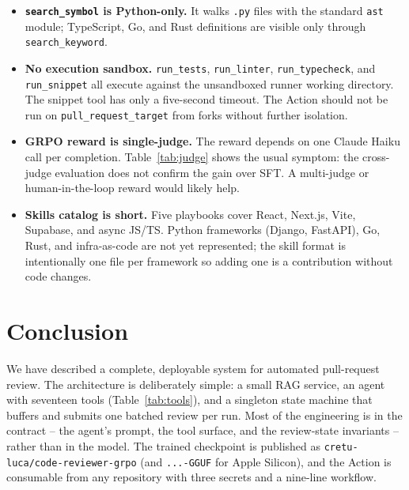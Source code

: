 \documentclass[11pt,a4paper]{article}
\newcommand{\code}[1]{\texttt{\small #1}}
\begin{document}
\begin{itemize}[leftmargin=*]
  \item \textbf{\code{search\_symbol} is Python-only.} It walks
        \code{.py} files with the standard \code{ast} module; TypeScript,
        Go, and Rust definitions are visible only through
        \code{search\_keyword}.
  \item \textbf{No execution sandbox.} \code{run\_tests},
        \code{run\_linter}, \code{run\_typecheck}, and \code{run\_snippet}
        all execute against the unsandboxed runner working directory. The
        snippet tool has only a five-second timeout. The Action should
        not be run on \code{pull\_request\_target} from forks without
        further isolation.
  \item \textbf{GRPO reward is single-judge.} The reward depends on one
        Claude Haiku call per completion. Table~\ref{tab:judge} shows the
        usual symptom: the cross-judge evaluation does not confirm the
        gain over SFT. A multi-judge or human-in-the-loop reward would
        likely help.
  \item \textbf{Skills catalog is short.} Five playbooks cover React,
        Next.js, Vite, Supabase, and async JS/TS. Python frameworks
        (Django, FastAPI), Go, Rust, and infra-as-code are not yet
        represented; the skill format is intentionally one file per
        framework so adding one is a contribution without code changes.
\end{itemize}

\section{Conclusion}

We have described a complete, deployable system for automated pull-request
review. The architecture is deliberately simple: a small RAG service, an
agent with seventeen tools (Table~\ref{tab:tools}), and a singleton state
machine that buffers and submits one batched review per run. Most of the
engineering is in the contract -- the agent's prompt, the tool surface, and
the review-state invariants -- rather than in the model. The trained
checkpoint is published as
\code{cretu-luca/code-reviewer-grpo} (and \code{...-GGUF} for Apple Silicon),
and the Action is consumable from any repository with three secrets and a
nine-line workflow.
\end{document}

